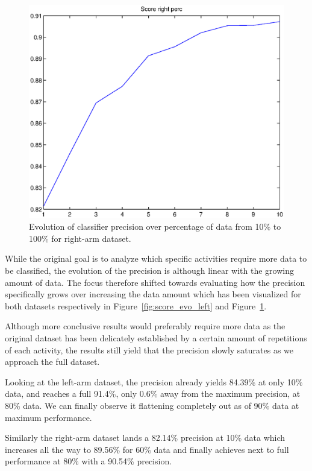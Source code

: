 \documentclass{sig-alternate}
\begin{document}
\begin{figure}[t]
  \centering
  \includegraphics[scale=0.35]{./matlab_output/score_perc_right_3.eps}
  \caption{Evolution of classifier precision over percentage of data from 10\% to 100\% for right-arm dataset.}
  \label{fig:score_evo_right}
\end{figure}

While the original goal is to analyze which specific activities require more data to be classified, the evolution of the precision is although linear with the growing amount of data. The focus therefore shifted towards evaluating how the precision specifically grows over increasing the data amount which has been visualized for both datasets respectively in Figure~\ref{fig:score_evo_left} and Figure~\ref{fig:score_evo_right}. 

Although more conclusive results would preferably require more data as the original dataset has been delicately established by a certain amount of repetitions of each activity, the results still yield that the precision slowly saturates as we approach the full dataset.

Looking at the left-arm dataset, the precision already yields 84.39\% at only 10\% data, and reaches a full 91.4\%, only 0.6\% away from the maximum precision, at 80\% data. We can finally observe it flattening completely out as of 90\% data at maximum performance.

Similarly the right-arm dataset lands a 82.14\% precision at 10\% data which increases all the way to 89.56\% for 60\% data and finally achieves next to full performance at 80\% with a 90.54\% precision.
\end{document}
